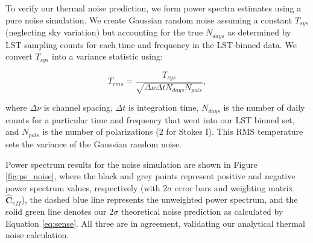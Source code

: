 \documentclass[preprint2,numberedappendix,tighten]{aastex6}  %
\begin{document}
To verify our thermal noise prediction, we form power spectra estimates using a pure noise simulation. We create Gaussian random noise assuming a constant $T_{sys}$ (neglecting sky variation) but accounting for the true $N_{days}$ as determined by LST sampling counts for each time and frequency in the LST-binned data. We convert $T_{sys}$ into a variance statistic using:

\begin{equation}
T_{rms} = \frac{T_{sys}}{\sqrt{\Delta\nu \Delta t N_{days} N_{pols}}},
\end{equation}

\noindent where $\Delta\nu$ is channel spacing, $\Delta t$ is integration time, $N_{days}$ is the number of daily counts for a particular time and frequency that went into our LST binned set, and $N_{pols}$ is the number of polarizations ($2$ for Stokes I). This RMS temperature sets the variance of the Gaussian random noise.

Power spectrum results for the noise simulation are shown in Figure \ref{fig:ps_noise}, where the black and grey points represent positive and negative power spectrum values, respectively (with $2\sigma$ error bars and weighting matrix $\hat{\textbf{C}}_{eff}$), the dashed blue line represents the unweighted power spectrum, and the solid green line denotes our $2\sigma$ theoretical noise prediction as calculated by Equation \eqref{eq:sense}. All three are in agreement, validating our analytical thermal noise calculation. 
\end{document}
